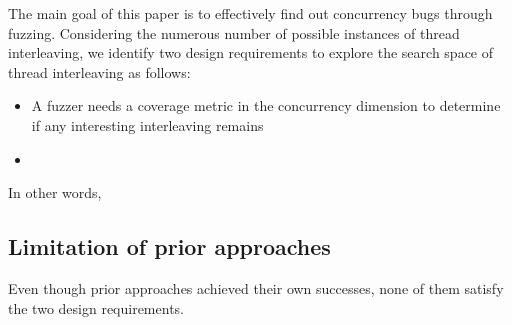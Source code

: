 



%
The main goal of this paper is to effectively find out concurrency
bugs through fuzzing.
%
Considering the numerous number of possible instances of thread
interleaving, we identify two design requirements to explore the
search space of thread interleaving as follows:

\begin{itemize}
\item A fuzzer needs a coverage metric in the concurrency dimension to
  determine if any interesting interleaving remains
\item 
\end{itemize}


In other words,


\subsection{Limitation of prior approaches}
\label{ss:existingapproaches}

Even though prior approaches achieved their own successes, none of
them satisfy the two design requirements.

\PP{}


